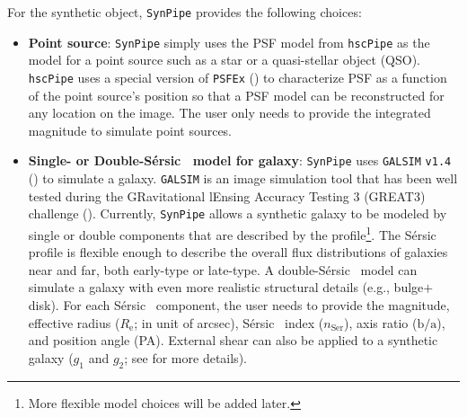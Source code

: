 \documentclass[useamsfonts]{pasj01}
\def\ser{{S\'{e}rsic\ }}
\def\hscpipe{\texttt{hscPipe}}
\def\synpipe{\texttt{SynPipe}}
\def\galsim{\texttt{G}{\scriptsize \texttt{AL}}\texttt{S}{\scriptsize \texttt{IM}}}
\begin{document}
    For the synthetic object, \synpipe{} provides the following choices:

    \begin{itemize}

        \item \textbf{Point source}:
            \synpipe{} simply uses the PSF model from \hscpipe{} as the model for
            a point source such as a star or a quasi-stellar object (QSO).
            \hscpipe{} uses a special version of \texttt{PSFEx}
            (\citealt{Bertin2011, Bertin2013}) to characterize PSF as a function
            of the point source's position so that a PSF model can be reconstructed 
            for any location on the image.
            The user only needs to provide the integrated magnitude to simulate
            point sources.

        \item \textbf{Single- or Double-\ser{} model for galaxy}:
            \texttt{SynPipe} uses \galsim{} \texttt{v1.4} (\citealt{Rowe2015}) to
            simulate a galaxy.
            \galsim{} is an image simulation tool that has been well tested during
            the GRavitational lEnsing Accuracy Testing 3 (GREAT3) challenge 
            (\citealt{Mandelbaum2014}).
            Currently, \synpipe{} allows a synthetic galaxy to be modeled by single
            or double components that are described by the \citet{Sersic1963}
            profile\footnote{More flexible model choices will be added later.}.
            The \ser{} profile is flexible enough to describe the overall flux
            distributions of galaxies near and far, both early-type or late-type.
            A double-\ser{} model can simulate a galaxy with even more realistic
            structural details (e.g., bulge$+$disk).
            For each \ser{} component, the user needs to provide the magnitude,
            effective radius ($R_{\mathrm{e}}$; in unit of arcsec), \ser{} index
            ($n_{\mathrm{Ser}}$), axis ratio ($\mathrm{b}/\mathrm{a}$), and position
            angle (PA).
            External shear can also be applied to a synthetic galaxy ($g_1$ and 
            $g_2$; see \citealt{Rowe2015} for more details).


\end{itemize}
\end{document}
